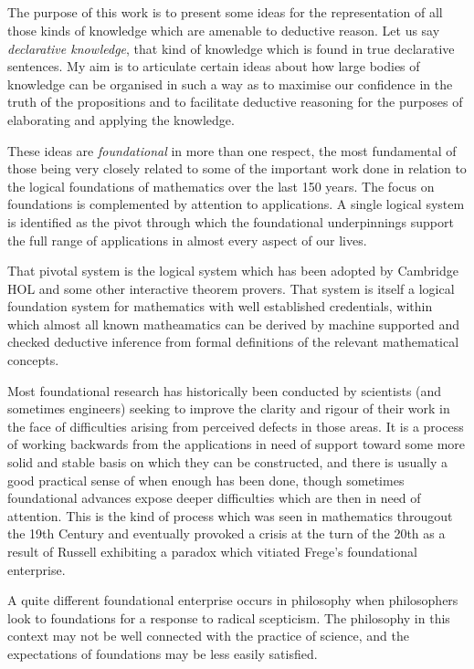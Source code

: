 \documentclass[10pt,titlepage]{book}
\begin{document}
\subsection{}

The purpose of this work is to present some ideas for the representation of all those kinds of knowledge which are amenable to deductive reason.
Let us say \emph{declarative knowledge}, that kind of knowledge which is found in true declarative sentences.
My aim is to articulate certain ideas about how large bodies of knowledge can be organised in such a way as to maximise our confidence in the truth of the propositions and to facilitate deductive reasoning for the purposes of elaborating and applying the knowledge.

These ideas are \emph{foundational} in more than one respect, the most fundamental of those being very closely related to some of the important work done in relation to the logical foundations of mathematics over the last 150 years.
The focus on foundations is complemented by attention to applications.
A single logical system is identified as the pivot through which the foundational underpinnings support the full range of applications in almost every aspect of our lives.

That pivotal system is the logical system which has been adopted by Cambridge HOL and some other interactive theorem provers.
That system is itself a logical foundation system for mathematics with well established credentials, within which almost all known matheamatics can be derived by machine supported and checked deductive inference from formal definitions of the relevant mathematical concepts.

Most foundational research has historically been conducted by scientists (and sometimes engineers) seeking to improve the clarity and rigour of their work in the face of difficulties arising from perceived defects in those areas.
  It is a process of working backwards from the applications in need of support toward some more solid and stable basis on which they can be constructed, and there is usually a good practical sense of when enough has been done, though sometimes foundational advances expose deeper difficulties which are then in need of attention.
  This is the kind of process which was seen in mathematics througout the 19th Century and eventually provoked a crisis at the turn of the 20th as a result of Russell exhibiting a paradox which vitiated Frege's foundational enterprise.

  A quite different foundational enterprise occurs in philosophy when philosophers look to foundations for a response to radical scepticism.  The philosophy in this context may not be well connected with the practice of science, and the expectations of foundations may be less easily satisfied.
\end{document}
